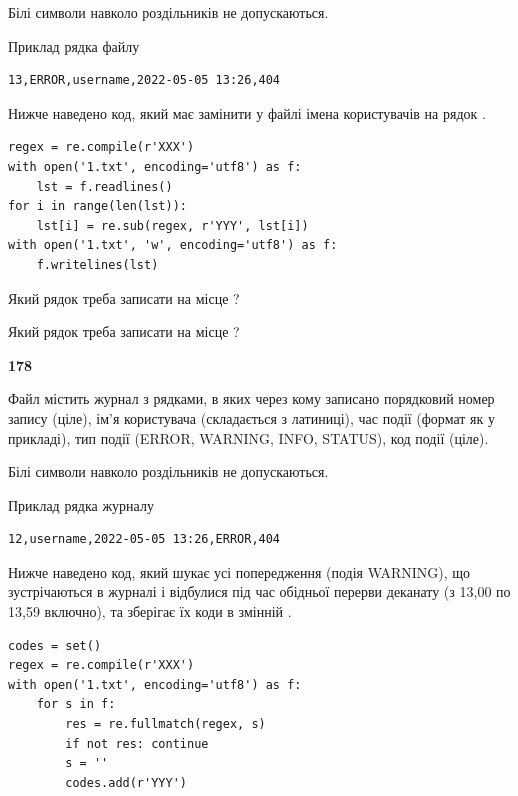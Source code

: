 Білі символи навколо роздільників не допускаються.

Приклад рядка файлу



\begin{verbatim}
13,ERROR,username,2022-05-05 13:26,404
\end{verbatim}


Нижче наведено код, який має замінити у файлі імена користувачів на рядок .



\begin{verbatim}
regex = re.compile(r'XXX')
with open('1.txt', encoding='utf8') as f:
    lst = f.readlines()
for i in range(len(lst)):
    lst[i] = re.sub(regex, r'YYY', lst[i])
with open('1.txt', 'w', encoding='utf8') as f:
    f.writelines(lst)
\end{verbatim}







Який рядок треба записати на місце  ?\par
\vspace{5mm}


Який рядок треба записати на місце  ?\par


\newpage

{\begin {center}\textbf{ 178}\end {center}}\par
Файл  містить журнал з рядками, в яких через кому записано поряд\-ко\-вий номер запису (ціле), ім'я користувача (складається з латиниці), час події (фор\-мат як у прикладі), тип події (ERROR, WARNING, INFO, STATUS), код події (ціле).

Білі символи навколо роздільників не допускаються.

Приклад рядка журналу



\begin{verbatim}
12,username,2022-05-05 13:26,ERROR,404
\end{verbatim}


Нижче наведено код, який шукає усі попередження (подія WARNING), що зустрі\-ча\-ються в журналі і відбулися під час обідньої перерви деканату (з 13,00 по 13,59 включно), та зберігає їх коди в змінній .



\begin{verbatim}
codes = set()
regex = re.compile(r'XXX')
with open('1.txt', encoding='utf8') as f:
    for s in f:
        res = re.fullmatch(regex, s)
        if not res: continue
        s = ''
        codes.add(r'YYY')
\end{verbatim}








